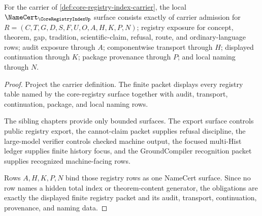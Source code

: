 \begin{theorem}
\label{thm:core-registry-index-namecert-obligations}
For the carrier of \autoref{def:core-registry-index-carrier}, the local $\NameCert_{\CoreRegistryIndexUp}$ surface consists exactly of carrier admission for $R=(C,T,G,D,S,F,U,O,A,H,K,P,N)$; registry exposure for concept, theorem, gap, tradition, scientific-claim, refusal, route, and ordinary-language rows; audit exposure through $A$; componentwise transport through $H$; displayed continuation through $K$; package provenance through $P$; and local naming through $N$.
\end{theorem}
\begin{proof}
Project the carrier definition. The finite packet displays every registry table named by the core-registry surface together with audit, transport, continuation, package, and local naming rows.

The sibling chapters provide only bounded surfaces. The export surface controls public registry export, the cannot-claim packet supplies refusal discipline, the large-model verifier controls checked machine output, the focused multi-Hist ledger supplies finite history focus, and the GroundCompiler recognition packet supplies recognized machine-facing rows.

Rows $A,H,K,P,N$ bind those registry rows as one NameCert surface. Since no row names a hidden total index or theorem-content generator, the obligations are exactly the displayed finite registry packet and its audit, transport, continuation, provenance, and naming data.
\end{proof}

